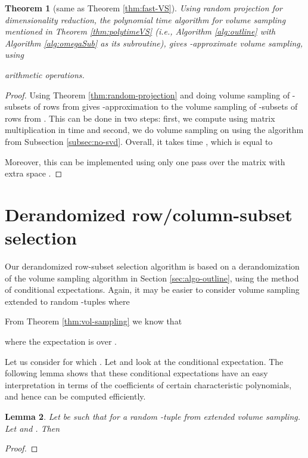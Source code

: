 \documentclass[11pt]{article}
\newtheorem{theorem}{Theorem}
\newtheorem{lemma}[theorem]{Lemma}
\begin{document}
\begin{theorem}[same as Theorem \ref{thm:fast-VS}]
Using random projection for dimensionality reduction, the polynomial time algorithm for volume sampling mentioned in Theorem \ref{thm:polytimeVS} (i.e., Algorithm \ref{alg:outline} with Algorithm \ref{alg:omegaSub} as its subroutine), gives -approximate volume sampling, using

arithmetic operations.
\end{theorem}
\begin{proof}
Using Theorem \ref{thm:random-projection} and doing volume sampling of -subsets of rows from  gives -approximation to the volume sampling of -subsets of rows from . This can be done in two steps: first, we compute  using matrix multiplication in time  and second, we do volume sampling on  using the algorithm from Subsection \ref{subsec:no-svd}. Overall, it takes time , which is equal to

Moreover, this can be implemented using only one pass over the matrix  with extra space .
\end{proof}


\section{Derandomized row/column-subset selection} \label{sec:derand}
Our derandomized row-subset selection algorithm is based on a derandomization of the volume sampling algorithm in Section \ref{sec:algo-outline}, using the method of conditional expectations. Again, it may be easier to consider volume sampling extended to random -tuples  where

From Theorem \ref{thm:vol-sampling} we know that

where the expectation is over .

Let us consider  for which . Let  and look at the conditional expectation. The following lemma shows that these conditional expectations have an easy interpretation in terms of the coefficients of certain characteristic polynomials, and hence can be computed efficiently.

\begin{lemma} \label{lemma:conditional}
Let  be such that  for a random -tuple  from extended volume sampling. Let  and . Then

\end{lemma}
\begin{proof}

\end{proof}
\end{document}
